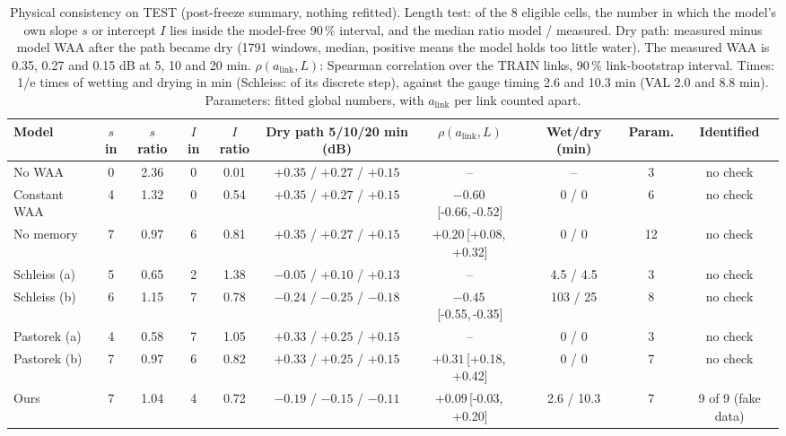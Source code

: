 \documentclass[reprint,aps,pra,amsmath,amssymb,nofootinbib,superscriptaddress]{revtex4-2}
\newcommand{\alink}{a_{\mathrm{link}}}
\newcommand{\iv}[2]{\,[#1,\,#2]}
\begin{document}
\begin{table}[t]
\caption{Physical consistency on TEST (post-freeze summary, nothing refitted). Length test: of the 8 eligible cells, the
number in which the model's own slope $s$ or intercept $I$ lies inside the model-free 90\,\% interval, and the median ratio
model / measured. Dry path: measured minus model WAA after the path became dry (1791 windows, median, positive means the
model holds too little water). The measured WAA is 0.35, 0.27 and 0.15 dB at 5, 10 and 20 min. $\rho(\alink, L)$: Spearman
correlation over the TRAIN links, 90\,\% link-bootstrap interval. Times: 1/e times of wetting and drying in min (Schleiss:
of its discrete step), against the gauge timing 2.6 and 10.3 min (VAL 2.0 and 8.8 min). Parameters: fitted global numbers,
with $\alink$ per link counted apart.}
\label{tab:consistency}
\footnotesize\setlength{\tabcolsep}{2pt}
\begin{ruledtabular}
\begin{tabular}{lccccccccc}
Model & $s$ in & $s$ ratio & $I$ in & $I$ ratio & Dry path 5/10/20 min (dB) & $\rho(\alink, L)$ & Wet/dry (min) & Param. & Identified\\
\hline
No WAA & 0 & 2.36 & 0 & 0.01 & $+0.35$ / $+0.27$ / $+0.15$ & -- & -- & 3 & no check\\
Constant WAA & 4 & 1.32 & 0 & 0.54 & $+0.35$ / $+0.27$ / $+0.15$ & $-0.60$\iv{-0.66}{-0.52} & 0 / 0 & 6 & no check\\
No memory & 7 & 0.97 & 6 & 0.81 & $+0.35$ / $+0.27$ / $+0.15$ & $+0.20$\iv{+0.08}{+0.32} & 0 / 0 & 12 & no check\\
Schleiss (a) & 5 & 0.65 & 2 & 1.38 & $-0.05$ / $+0.10$ / $+0.13$ & -- & 4.5 / 4.5 & 3 & no check\\
Schleiss (b) & 6 & 1.15 & 7 & 0.78 & $-0.24$ / $-0.25$ / $-0.18$ & $-0.45$\iv{-0.55}{-0.35} & 103 / 25 & 8 & no check\\
Pastorek (a) & 4 & 0.58 & 7 & 1.05 & $+0.33$ / $+0.25$ / $+0.15$ & -- & 0 / 0 & 3 & no check\\
Pastorek (b) & 7 & 0.97 & 6 & 0.82 & $+0.33$ / $+0.25$ / $+0.15$ & $+0.31$\iv{+0.18}{+0.42} & 0 / 0 & 7 & no check\\
Ours & 7 & 1.04 & 4 & 0.72 & $-0.19$ / $-0.15$ / $-0.11$ & $+0.09$\iv{-0.03}{+0.20} & 2.6 / 10.3 & 7 & 9 of 9 (fake data)\\
\end{tabular}
\end{ruledtabular}
\end{table}
\end{document}
